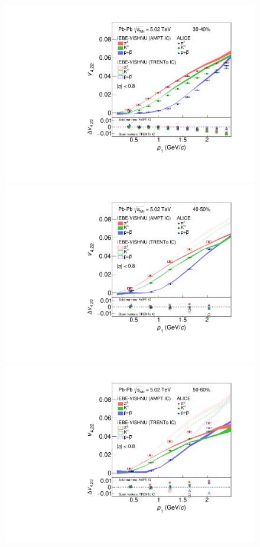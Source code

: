 \begin{figure}[!htb]
\begin{center}
\includegraphics[scale=0.26]{figures/model/TrentoAndAMPT_v422_gap00_new_30-40_PID2.pdf}
\includegraphics[scale=0.26]{figures/model/TrentoAndAMPT_v422_gap00_new_40-50_PID2.pdf}
\includegraphics[scale=0.26]{figures/model/TrentoAndAMPT_v422_gap00_new_50-60_PID2.pdf}

\end{center}
\end{figure}

